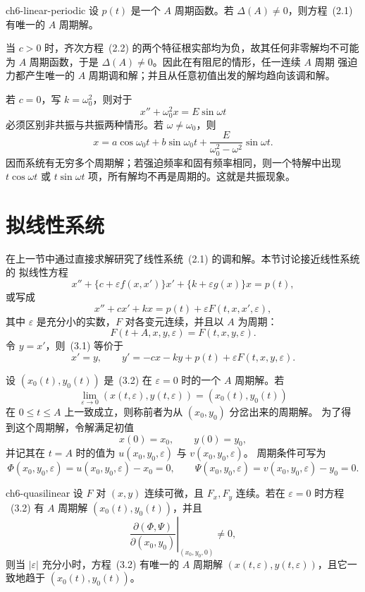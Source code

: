 \begin{theorem}{}{ch6-linear-periodic}
设 $p(t)$ 是一个 $A$ 周期函数。若 $\Delta(A)\ne0$，则方程~(2.1) 有唯一的
$A$ 周期解。
\end{theorem}

当 $c>0$ 时，齐次方程~(2.2) 的两个特征根实部均为负，故其任何非零解均不可能
为 $A$ 周期函数，于是 $\Delta(A)\ne0$。因此在有阻尼的情形，任一连续 $A$ 周期
强迫力都产生唯一的 $A$ 周期调和解；并且从任意初值出发的解均趋向该调和解。

若 $c=0$，写 $k=\omega_0^2$，则对于
\[
  x''+\omega_0^2x=E\sin\omega t \tag{2.10}
\]
必须区别非共振与共振两种情形。若 $\omega\ne\omega_0$，则
\[
  x=a\cos\omega_0t+b\sin\omega_0t+
    \frac{E}{\omega_0^2-\omega^2}\sin\omega t. \tag{2.11}
\]
因而系统有无穷多个周期解；若强迫频率和固有频率相同，则一个特解中出现
$t\cos\omega t$ 或 $t\sin\omega t$ 项，所有解均不再是周期的。这就是共振现象。

\section{拟线性系统}

在上一节中通过直接求解研究了线性系统~(2.1) 的调和解。本节讨论接近线性系统的
拟线性方程
\[
  x''+\{c+\varepsilon f(x,x')\}x'+\{k+\varepsilon g(x)\}x=p(t),
\]
或写成
\[
  x''+cx'+kx=p(t)+\varepsilon F(t,x,x',\varepsilon), \tag{3.1}
\]
其中 $\varepsilon$ 是充分小的实数，$F$ 对各变元连续，并且以 $A$ 为周期：
\[
  F(t+A,x,y,\varepsilon)=F(t,x,y,\varepsilon).
\]
令 $y=x'$，则~(3.1) 等价于
\[
  x'=y,\qquad y'=-cx-ky+p(t)+\varepsilon F(t,x,y,\varepsilon). \tag{3.2}
\]

设 $(x_0(t),y_0(t))$ 是~(3.2) 在 $\varepsilon=0$ 时的一个 $A$ 周期解。若
\[
  \lim_{\varepsilon\to0}(x(t,\varepsilon),y(t,\varepsilon))
  =(x_0(t),y_0(t)) \tag{3.5}
\]
在 $0\leq t\leq A$ 上一致成立，则称前者为从 $(x_0,y_0)$ 分岔出来的周期解。
为了得到这个周期解，令解满足初值
\[
  x(0)=x_0,\qquad y(0)=y_0,
\]
并记其在 $t=A$ 时的值为 $u(x_0,y_0,\varepsilon)$ 与 $v(x_0,y_0,\varepsilon)$。
周期条件可写为
\[
  \Phi(x_0,y_0,\varepsilon)=u(x_0,y_0,\varepsilon)-x_0=0,
  \qquad
  \Psi(x_0,y_0,\varepsilon)=v(x_0,y_0,\varepsilon)-y_0=0. \tag{3.7}
\]

\begin{theorem}{}{ch6-quasilinear}
设 $F$ 对 $(x,y)$ 连续可微，且 $F_x,F_y$ 连续。若在 $\varepsilon=0$ 时方程
~(3.2) 有 $A$ 周期解 $(x_0(t),y_0(t))$，并且
\[
  \left.\frac{\partial(\Phi,\Psi)}{\partial(x_0,y_0)}
  \right|_{(x_0,y_0,0)}\ne0, \tag{3.9}
\]
则当 $|\varepsilon|$ 充分小时，方程~(3.2) 有唯一的 $A$ 周期解
$(x(t,\varepsilon),y(t,\varepsilon))$，且它一致地趋于 $(x_0(t),y_0(t))$。
\end{theorem}

